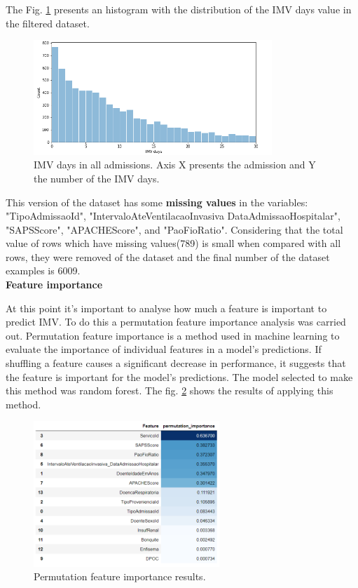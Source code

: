 \documentclass[journal]{IEEEtran} %
\begin{document}
The Fig. \ref{fig:hist} presents an histogram with the distribution of the IMV days value in the filtered dataset.

\begin{figure}[htp]
    \centering
    \includegraphics[width=9cm]{Project2-Report_FAA/figures/hist_imv.png}
    \caption{IMV days in all admissions. Axis X presents the admission and Y the number of the IMV days.}
    \label{fig:hist}
\end{figure}

This version of the dataset has some \textbf{missing values} in the variables: "TipoAdmissaoId", "IntervaloAteVentilacaoInvasiva DataAdmissaoHospitalar", "SAPSScore", "APACHEScore", and "PaoFioRatio". Considering that the total value of rows which have missing values(789) is small when compared with all rows, they were removed of the dataset and the final number of the dataset examples is 6009.\\

\textbf{Feature importance}

At this point it's important to analyse how much a feature is important to predict IMV. To do this a permutation feature importance analysis was carried out. Permutation feature importance is a method used in machine learning to evaluate the importance of individual features in a model's predictions. If shuffling a feature causes a significant decrease in performance, it suggests that the feature is important for the model's predictions. The model selected to make this method was random forest. The fig. \ref{fig:importance} shows the results of applying this method.

\begin{figure}[htp]
    \centering
    \includegraphics[width=7cm]{Project2-Report_FAA/figures/feature_sel.png}
    \caption{Permutation feature importance results.}
    \label{fig:importance}
\end{figure}
\end{document}
